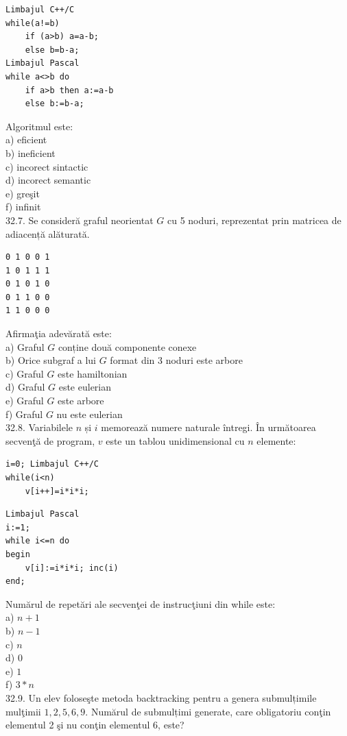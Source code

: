 \begin{itemize}
\begin{enumerate}
\begin{verbatim}
Limbajul C++/C
while(a!=b)
    if (a>b) a=a-b;
    else b=b-a;
Limbajul Pascal
while a<>b do
    if a>b then a:=a-b
    else b:=b-a;
\end{verbatim}
Algoritmul este:
\\
a) eficient
\\
b) ineficient
\\
c) incorect sintactic
\\
d) incorect semantic
\\
e) greşit
\\
f) infinit
\\
32.7. Se consideră graful neorientat $G$ cu 5 noduri, reprezentat prin matricea de adiacență alăturată.
\begin{verbatim}
0 1 0 0 1
1 0 1 1 1
0 1 0 1 0
0 1 1 0 0
1 1 0 0 0
\end{verbatim}
Afirmaţia adevărată este:
\\
a) Graful $G$ conține două componente conexe
\\
b) Orice subgraf a lui $G$ format din 3 noduri este arbore
\\
c) Graful $G$ este hamiltonian
\\
d) Graful $G$ este eulerian
\\
e) Graful $G$ este arbore
\\
f) Graful $G$ nu este eulerian
\\
32.8. Variabilele $n$ și $i$ memorează numere naturale întregi. În următoarea secvenţă de program, $v$ este un tablou unidimensional cu $n$ elemente:
\begin{verbatim}
i=0; Limbajul C++/C
while(i<n)
    v[i++]=i*i*i;
\end{verbatim}
\begin{verbatim}
Limbajul Pascal
i:=1;
while i<=n do
begin
    v[i]:=i*i*i; inc(i)
end;
\end{verbatim}
Numărul de repetări ale secvenţei de instrucţiuni din while este:
\\
a) $n+1$
\\
b) $n-1$
\\
c) $n$
\\
d) $0$
\\
e) $1$
\\
f) $3*n$
\\
32.9. Un elev foloseşte metoda backtracking pentru a genera submulțimile mulţimii ${1,2,5,6,9}$. Numărul de submulțimi generate, care obligatoriu conţin elementul 2 şi nu conţin elementul 6, este?
\\

\end{enumerate}
\end{itemize}
